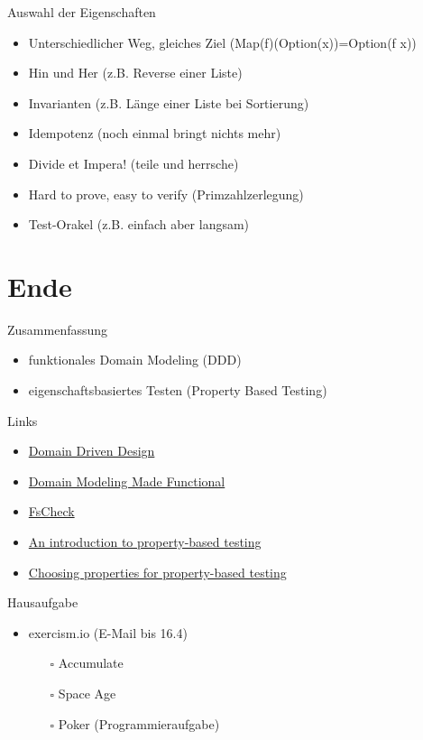 \documentclass[t]{beamer}
\begin{document}
\begin{frame}[label={sec:org2904f94}]{Auswahl der Eigenschaften}
\begin{itemize}
\item Unterschiedlicher Weg, gleiches Ziel (Map(f)(Option(x))=Option(f x))
\item Hin und Her (z.B. Reverse einer Liste)
\item Invarianten (z.B. Länge einer Liste bei Sortierung)
\item Idempotenz (noch einmal bringt nichts mehr)
\item Divide et Impera! (teile und herrsche)
\item Hard to prove, easy to verify (Primzahlzerlegung)
\item Test-Orakel (z.B. einfach aber langsam)
\end{itemize}
\end{frame}

\section{Ende }
\label{sec:org9a37ce3}
\begin{frame}[label={sec:orgc1aefa2}]{Zusammenfassung}
\begin{itemize}
\item funktionales Domain Modeling (DDD)
\item eigenschaftsbasiertes Testen (Property Based Testing)
\end{itemize}
\end{frame}

\begin{frame}[label={sec:orge56dbc8}]{Links}
\begin{itemize}
\item \href{https://fsharpforfunandprofit.com/ddd/}{Domain Driven Design}
\item \href{https://fsharpforfunandprofit.com/books/}{Domain Modeling Made Functional}
\item \href{https://github.com/fscheck/FsCheck}{FsCheck}
\item \href{https://fsharpforfunandprofit.com/posts/property-based-testing/}{An introduction to property-based testing}
\item \href{https://fsharpforfunandprofit.com/posts/property-based-testing-2/}{Choosing properties for property-based testing}
\end{itemize}
\end{frame}

\begin{frame}[label={sec:orgebb3a1f}]{Hausaufgabe}
\begin{itemize}
\item exercism.io (E-Mail bis 16.4)
\begin{itemize}
\item[{$\square$}] Accumulate
\item[{$\square$}] Space Age
\item[{$\square$}] Poker (Programmieraufgabe)
\end{itemize}
\end{itemize}
\end{frame}
\end{document}
